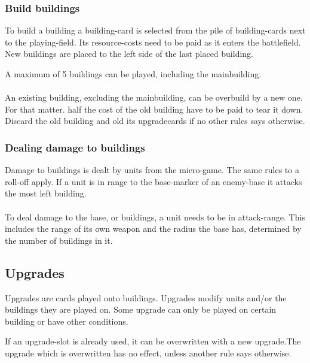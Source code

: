 \documentclass[a5paper,pagesize,10pt,bibtotoc,pointlessnumbers,
normalheadings,DIV=9,twoside=false]{scrbook}
\begin{document}
\subsubsection{Build buildings}
To build a building a building-card is selected from the pile of building-cards next to the playing-field. Its resource-costs need to be paid as it enters the battlefield.
New buildings are placed to the left side of the last placed building.

A maximum of 5 buildings can be played, including the mainbuilding.\\
\\
An existing building, excluding the mainbuilding, can be overbuild by a new one. For that matter. half the cost of the old building have to be paid to tear it down. Discard the old building and old its upgradecards if no other rules says otherwise.

\subsubsection{Dealing damage to buildings}
Damage to buildings is dealt by units from the micro-game. The same rules to a roll-off apply. If a unit is in range to the base-marker of an enemy-base it attacks the most left building.\\
\\
To deal damage to the base, or buildings, a unit needs to be in attack-range. This includes the range of its own weapon and the radius the base has, determined by the number of buildings in it.

\subsection{Upgrades}
Upgrades are cards played onto buildings. Upgrades modify units and/or the buildings they are played on. Some upgrade can only be played on certain building or have other conditions.

If an upgrade-slot is already used, it can be overwritten with a new upgrade.The upgrade which is overwritten has no effect, unless another rule says otherwise.\\
\end{document}
